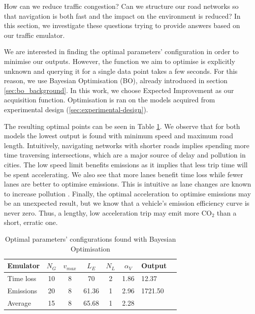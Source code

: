 


How can we reduce traffic congestion? Can we structure our road networks so that navigation is both fast and the impact on the environment is reduced? In this section, we investigate these questions trying to provide answers based on our traffic emulator.

We are interested in finding the optimal parameters' configuration in order to minimise our outputs. However, the function we aim to optimise is explicitly unknown and querying it for a single data point takes a few seconds. For this reason, we use Bayesian Optimisation (BO), already introduced in section \ref{sec:bo_background}. In this work, we choose Expected Improvement as our acquisition function. Optimisation is ran on the models acquired from experimental design (\ref{sec:experimental-design}).

The resulting optimal points can be seen in Table \ref{table:optimal_points}. We observe that for both models the lowest output is found with minimum speed and maximum road length. Intuitively, navigating networks with shorter roads implies spending more time traversing intersections, which are a major source of delay and pollution in cities. The low speed limit benefits emissions as it implies that less trip time will be spent accelerating. We also see that more lanes benefit time loss while fewer lanes are better to optimise emissions. This is intuitive as lane changes are known to increase pollution \cite{rakha2000requirements}. Finally, the optimal acceleration to optimise emissions may be an unexpected result, but we know that a vehicle's emission efficiency curve is never zero. Thus, a lengthy, low acceleration trip may emit more CO$_2$ than a short, erratic one.

\begin{table}[h!]
    \centering
    \caption{Optimal parameters' configurations found with Bayesian Optimisation}
    \label{table:optimal_points}
    \begin{tabular}{@{} l *5c l c @{} }
    \toprule
    \multicolumn{1}{c}{Emulator}  & $N_G$ &  $v_{max}$ & $L_E$ & $N_L$ & $\alpha_V$ & Output \\ 
    \midrule
        Time loss & 10 & 8 & 70 & 2 & 1.86 & 12.37\\
        Emissions & 20 & 8 & 61.36 & 1 & 2.96 & 1721.50\\
    \midrule
        Average & 15 & 8 & 65.68 & 1 & 2.28 & \\
    \bottomrule
    \end{tabular}
\end{table}

